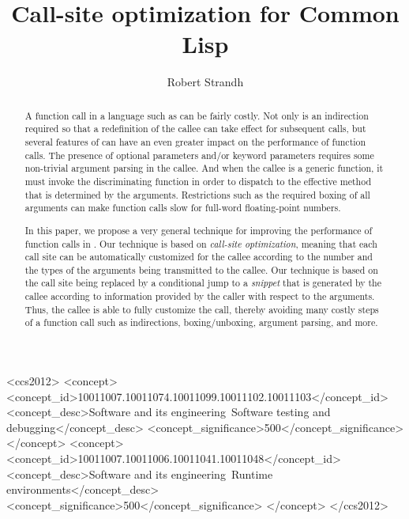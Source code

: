\documentclass[format=sigconf]{acmart}
\begin{document}
\title{Call-site optimization for Common Lisp}

\author{Robert Strandh}


\begin{abstract}
A function call in a language such as \commonlisp{} can be fairly
costly.  Not only is an indirection required so that a redefinition of
the callee can take effect for subsequent calls, but several features
of \commonlisp{} can have an even greater impact on the performance of
function calls.  The presence of optional parameters and/or keyword
parameters requires some non-trivial argument parsing in the callee.
And when the callee is a generic function, it must invoke the
discriminating function in order to dispatch to the effective
method that is determined by the arguments.  Restrictions such as the
required boxing of all arguments can make function calls slow for
full-word floating-point numbers.

In this paper, we propose a very general technique for improving the
performance of function calls in \commonlisp{}.  Our technique is
based on \emph{call-site optimization}, meaning that each call site
can be automatically customized for the callee according to the number
and the types of the arguments being transmitted to the callee.  Our
technique is based on the call site being replaced by a conditional
jump to a \emph{snippet} that is generated by the callee according to
information provided by the caller with respect to the arguments.
Thus, the callee is able to fully customize the call, thereby avoiding
many costly steps of a function call such as indirections,
boxing/unboxing, argument parsing, and more.
\end{abstract}


\begin{CCSXML}
<ccs2012>
<concept>
<concept_id>10011007.10011074.10011099.10011102.10011103</concept_id>
<concept_desc>Software and its engineering~Software testing and debugging</concept_desc>
<concept_significance>500</concept_significance>
</concept>
<concept>
<concept_id>10011007.10011006.10011041.10011048</concept_id>
<concept_desc>Software and its engineering~Runtime environments</concept_desc>
<concept_significance>500</concept_significance>
</concept>
</ccs2012>
\end{CCSXML}
\end{document}
